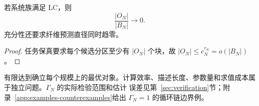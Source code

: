 \begin{corollary}[任务输出规模的必要条件]
\label{cor:attainment-output}
若系统族满足 LC，则
\[
\frac{|O_N|}{|B_N|}\to0.
\]
充分性还要求纤维预测直径同时趋零。
\end{corollary}

\begin{proof}
任务保真要求每个候选分区至少有 $|O_N|$ 个块，故
$|O_N|\le c_N^{\tau_N}=o(|B_N|)$。
\end{proof}

有限达到确立每个规模上的最优对象。计算效率、描述长度、参数量和求值成本属于独立问题。$\Gamma_N$ 的实际检验范围和估计
误差见第~\ref{sec:verification}节；附录~\ref{app:examples-counterexamples}给出 $\Gamma_N=1$ 的循环链边界例。
